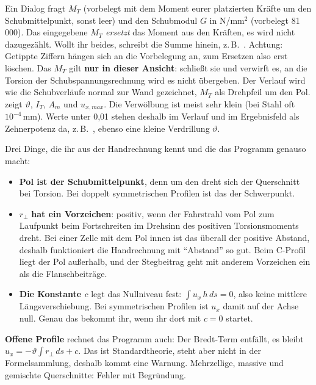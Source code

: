 Ein Dialog fragt $M_T$ (vorbelegt mit dem Moment eurer platzierten Kräfte um den
Schubmittelpunkt, sonst leer) und den Schubmodul $G$ in N/mm$^2$ (vorbelegt 81\,000). Das
eingegebene $M_T$ \emph{ersetzt} das Moment aus den Kräften, es wird nicht dazugezählt. Wollt ihr
beides, schreibt die Summe hinein, z.\,B.\ . Achtung: Getippte Ziffern hängen sich an
die Vorbelegung an, zum Ersetzen also erst löschen. Das $M_T$ gilt \textbf{nur in dieser Ansicht}:  schließt sie und verwirft es, an die
Torsion der Schubspannungsrechnung wird es nicht übergeben. Der Verlauf wird wie die
Schubverläufe normal zur Wand gezeichnet, $M_T$ als Drehpfeil um den Pol.  zeigt
$\vartheta$, $I_T$, $A_m$ und $u_{x,max}$. Die Verwölbung ist meist sehr klein (bei Stahl oft
$10^{-4}$\,mm). Werte unter 0,01 stehen deshalb im Verlauf und im Ergebnisfeld als Zehnerpotenz da,
z.\,B.\ , ebenso eine kleine Verdrillung $\vartheta$.

Drei Dinge, die ihr aus der Handrechnung kennt und die das Programm genauso macht:

\begin{itemize}
  \item \textbf{Pol ist der Schubmittelpunkt}, denn um den dreht sich der Querschnitt bei
        Torsion. Bei doppelt symmetrischen Profilen ist das der Schwerpunkt.
  \item $r_\perp$ \textbf{hat ein Vorzeichen}: positiv, wenn der Fahrstrahl vom Pol zum
        Laufpunkt beim Fortschreiten im Drehsinn des positiven Torsionsmoments dreht. Bei einer
        Zelle mit dem Pol innen ist das überall der positive Abstand, deshalb funktioniert die
        Handrechnung mit \enquote{Abstand} so gut. Beim C-Profil liegt der Pol außerhalb, und der
        Stegbeitrag geht mit anderem Vorzeichen ein als die Flanschbeiträge.
  \item \textbf{Die Konstante $c$} legt das Nullniveau fest: $\int u_x\,h\,ds = 0$, also keine
        mittlere Längsverschiebung. Bei symmetrischen Profilen ist $u_x$ damit auf der Achse null.
        Genau das bekommt ihr, wenn ihr dort mit $c = 0$ startet.
\end{itemize}

\textbf{Offene Profile} rechnet das Programm auch: Der Bredt-Term entfällt, es bleibt
$u_x = -\vartheta \int r_\perp\,ds + c$. Das ist Standardtheorie, steht aber nicht in der
Formelsammlung, deshalb kommt eine Warnung.
Mehrzellige, massive und gemischte Querschnitte: Fehler mit Begründung.

